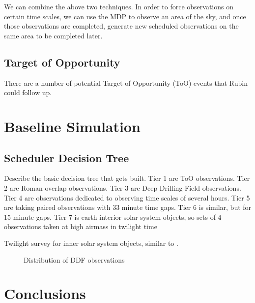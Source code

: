 \documentclass[]{aastex631}
\begin{document}
We can combine the above two techniques. In order to force observations on certain time scales, we can use the MDP to observe an area of the sky, and once those observations are completed, generate new scheduled observations on the same area to be completed later. 

\subsection{Target of Opportunity}

There are a number of potential Target of Opportunity (ToO) events that Rubin could follow up. 


\section{Baseline Simulation}


\subsection{Scheduler Decision Tree}
Describe the basic decision tree that gets built. Tier 1 are ToO observations. Tier 2 are Roman overlap observations. Tier 3 are Deep Drilling Field observations. Tier 4 are observations dedicated to observing time scales of several hours. Tier 5 are taking paired observations with 33 minute time gaps. Tier 6 is similar, but for 15 minute gaps. Tier 7 is earth-interior solar system objects, so sets of 4 observations taken at high airmass in twilight time 






Twilight survey for inner solar system objects, similar to \citet{Ye2020}.



\begin{figure}
\caption{Distribution of DDF observations \label{fig:tiers_ddf}}
\end{figure}

\section{Conclusions}
\end{document}
